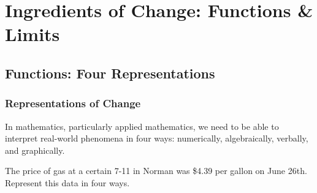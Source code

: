 \documentclass[notes]{subfiles}
\begin{document}
	\chapter{Ingredients of Change: Functions \& Limits}
	\setcounter{section}{1}
	\setcounter{page}{1}
	\fancyhead[LO,RE]{\bfseries \currentname}
	\fancyfoot[C]{{}}
	\fancyfoot[RO,LE]{\large \thepage}	%
	

	
\section*{Functions: Four Representations}\label{cs11}
	\subsection*{Representations of Change}
		In mathematics, particularly applied mathematics, we need to be able to interpret real-world phenomena in four ways: numerically, algebraically, verbally, and graphically.  

		\begin{ex}
			The price of gas at a certain 7-11 in Norman was \$4.39 per gallon on June 26th.  Represent this data in four ways.
		\end{ex}
		
\end{document}
